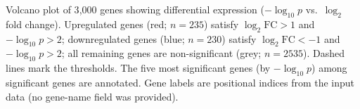 \caption{Volcano plot of 3{,}000 genes showing differential expression ($-\!\log_{10}p$ vs.\ $\log_2$ fold change). Upregulated genes (red; $n=235$) satisfy $\log_2\text{FC}>1$ and $-\!\log_{10}p>2$; downregulated genes (blue; $n=230$) satisfy $\log_2\text{FC}<-1$ and $-\!\log_{10}p>2$; all remaining genes are non-significant (grey; $n=2535$). Dashed lines mark the thresholds. The five most significant genes (by $-\!\log_{10}p$) among significant genes are annotated. Gene labels are positional indices from the input data (no gene-name field was provided).}
